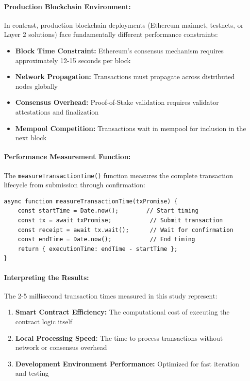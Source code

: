 \documentclass[12pt,a4paper]{article}
\begin{document}
\paragraph{Production Blockchain Environment:}
In contrast, production blockchain deployments (Ethereum mainnet, testnets, or Layer 2 solutions) face fundamentally different performance constraints:
\begin{itemize}
    \item \textbf{Block Time Constraint:} Ethereum's consensus mechanism requires approximately 12-15 seconds per block
    \item \textbf{Network Propagation:} Transactions must propagate across distributed nodes globally
    \item \textbf{Consensus Overhead:} Proof-of-Stake validation requires validator attestations and finalization
    \item \textbf{Mempool Competition:} Transactions wait in mempool for inclusion in the next block
\end{itemize}

\paragraph{Performance Measurement Function:}
The \texttt{measureTransactionTime()} function measures the complete transaction lifecycle from submission through confirmation:

\begin{verbatim}
async function measureTransactionTime(txPromise) {
    const startTime = Date.now();        // Start timing
    const tx = await txPromise;           // Submit transaction
    const receipt = await tx.wait();      // Wait for confirmation
    const endTime = Date.now();           // End timing
    return { executionTime: endTime - startTime };
}
\end{verbatim}

\paragraph{Interpreting the Results:}
The 2-5 millisecond transaction times measured in this study represent:
\begin{enumerate}
    \item \textbf{Smart Contract Efficiency:} The computational cost of executing the contract logic itself
    \item \textbf{Local Processing Speed:} The time to process transactions without network or consensus overhead
    \item \textbf{Development Environment Performance:} Optimized for fast iteration and testing
\end{enumerate}
\end{document}
